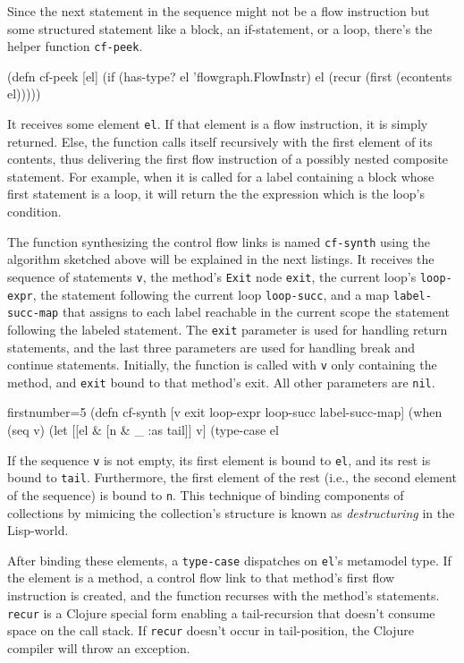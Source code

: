 \documentclass[11pt]{article}
\begin{document}
Since the next statement in the sequence might not be a flow instruction but
some structured statement like a block, an if-statement, or a loop, there's the
helper function \verb|cf-peek|.

\begin{clojurecode}
(defn cf-peek [el]
  (if (has-type? el 'flowgraph.FlowInstr)
    el
    (recur (first (econtents el)))))
\end{clojurecode}

It receives some element \verb|el|.  If that element is a flow instruction, it
is simply returned.  Else, the function calls itself recursively with the first
element of its contents, thus delivering the first flow instruction of a
possibly nested composite statement.  For example, when it is called for a
label containing a block whose first statement is a loop, it will return the
the expression which is the loop's condition.

The function synthesizing the control flow links is named \verb|cf-synth| using
the algorithm sketched above will be explained in the next listings.  It
receives the sequence of statements \verb|v|, the method's \verb|Exit| node
\verb|exit|, the current loop's \verb|loop-expr|, the statement following the
current loop \verb|loop-succ|, and a map \verb|label-succ-map| that assigns to
each label reachable in the current scope the statement following the labeled
statement.  The \verb|exit| parameter is used for handling return statements,
and the last three parameters are used for handling break and continue
statements.  Initially, the function is called with \verb|v| only containing
the method, and \verb|exit| bound to that method's exit.  All other parameters
are \verb|nil|.

\begin{clojurecode*}{firstnumber=5}
(defn cf-synth [v exit loop-expr loop-succ label-succ-map]
  (when (seq v)
    (let [[el & [n & _ :as tail]] v]
      (type-case el
\end{clojurecode*}

If the sequence \verb|v| is not empty, its first element is bound to \verb|el|,
and its rest is bound to \verb|tail|.  Furthermore, the first element of the
rest (i.e., the second element of the sequence) is bound to \verb|n|.  This
technique of binding components of collections by mimicing the collection's
structure is known as \emph{destructuring} in the Lisp-world.

After binding these elements, a \verb|type-case| dispatches on \verb|el|'s
metamodel type.  If the element is a method, a control flow link to that
method's first flow instruction is created, and the function recurses with the
method's statements.  \verb|recur| is a Clojure special form enabling a
tail-recursion that doesn't consume space on the call stack.  If \verb|recur|
doesn't occur in tail-position, the Clojure compiler will throw an exception.
\end{document}
